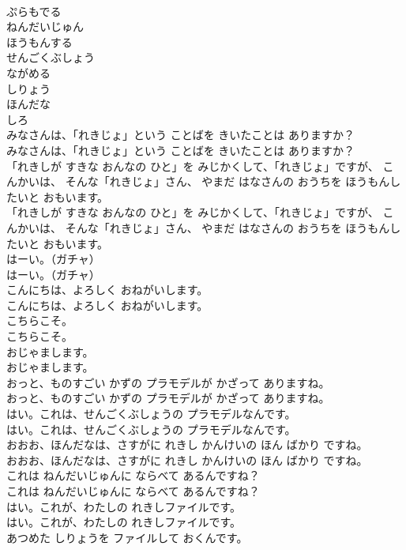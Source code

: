 \documentclass[8pt]{extreport}
\begin{document}
\begin{CJK}{UTF8}{min}
\\	ぷらもでる
\\	ねんだいじゅん
\\	ほうもんする
\\	せんごくぶしょう
\\	ながめる
\\	しりょう
\\	ほんだな
\\	しろ
\\	みなさんは、「れきじょ」という ことばを きいたことは ありますか？
\\	みなさんは、「れきじょ」という ことばを きいたことは ありますか？
\\	「れきしが すきな おんなの ひと」を みじかくして、「れきじょ」ですが、 こんかいは、 そんな「れきじょ」さん、 やまだ はなさんの おうちを ほうもんしたいと おもいます。
\\	「れきしが すきな おんなの ひと」を みじかくして、「れきじょ」ですが、 こんかいは、 そんな「れきじょ」さん、 やまだ はなさんの おうちを ほうもんしたいと おもいます。
\\	はーい。（ガチャ）
\\	はーい。（ガチャ）
\\	こんにちは、よろしく おねがいします。
\\	こんにちは、よろしく おねがいします。
\\	こちらこそ。
\\	こちらこそ。
\\	おじゃまします。
\\	おじゃまします。
\\	おっと、ものすごい かずの プラモデルが かざって ありますね。
\\	おっと、ものすごい かずの プラモデルが かざって ありますね。
\\	はい。これは、せんごくぶしょうの プラモデルなんです。
\\	はい。これは、せんごくぶしょうの プラモデルなんです。
\\	おおお、ほんだなは、さすがに れきし かんけいの ほん ばかり ですね。
\\	おおお、ほんだなは、さすがに れきし かんけいの ほん ばかり ですね。
\\	これは ねんだいじゅんに ならべて あるんですね？
\\	これは ねんだいじゅんに ならべて あるんですね？
\\	はい。これが、わたしの れきしファイルです。
\\	はい。これが、わたしの れきしファイルです。
\\	あつめた しりょうを ファイルして おくんです。

\end{CJK}
\end{document}
